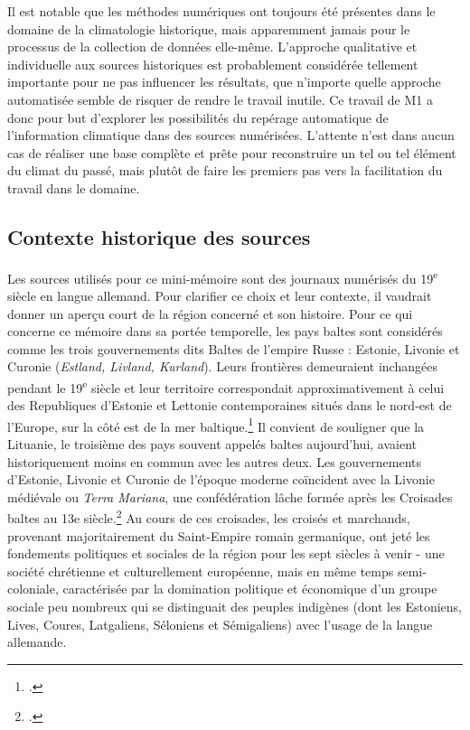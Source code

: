 \documentclass[a4paper,twoside,12pt]{article}
\begin{document}
Il est notable que les méthodes numériques ont toujours été présentes dans le domaine de la climatologie historique, mais apparemment jamais pour le processus de la collection de données elle-même. L'approche qualitative et individuelle aux sources historiques est probablement considérée tellement importante pour ne pas influencer les résultats, que n'importe quelle approche automatisée semble de risquer de rendre le travail inutile. Ce travail de M1 a donc pour but d'explorer les possibilités du repérage automatique de l'information climatique dans des sources numérisées. L'attente n'est dans aucun cas de réaliser une base complète et prête pour reconstruire un tel ou tel élément du climat du passé, mais plutôt de faire les premiers pas vers la facilitation du travail dans le domaine.



\subsection*{Contexte historique des sources}


Les sources utilisés pour ce mini-mémoire sont des journaux numérisés du 19\textsuperscript{e} siècle en langue allemand. Pour clarifier ce choix et leur contexte, il vaudrait donner un aperçu court de la région concerné et son histoire. Pour ce qui concerne ce mémoire dans sa portée temporelle, les pays baltes sont considérés comme les trois gouvernements dits Baltes de l'empire Russe : Estonie, Livonie et Curonie (\textit{Estland, Livland, Kurland}). Leurs frontières demeuraient inchangées pendant le 19\textsuperscript{e} siècle et leur territoire correspondait approximativement à celui des Republiques d'Estonie et Lettonie contemporaines situés dans le nord-est de l'Europe, sur la côté est de la mer baltique.\footcites[Pour un aperçu général de l'histoire de cette région, cf.][]{champonnois_estoniens_2004}{kasekamp_history_2018} Il convient de souligner que la Lituanie, le troisième des pays souvent appelés \og baltes \fg{} aujourd'hui, avaient historiquement moins en commun avec les autres deux. Les gouvernements d'Estonie, Livonie et Curonie de l'époque moderne coïncident avec la Livonie médiévale ou \textit{Terra Mariana}, une confédération lâche formée après les Croisades baltes au 13e siècle.\footcites[Une présentation critique de ces événements se trouve dans][]{murray_clash_2009}{selart_livland_2017} Au cours de ces croisades, les croisés et marchands, provenant majoritairement du Saint-Empire romain germanique, ont jeté les fondements politiques et sociales de la région pour les sept siècles à venir - une société chrétienne et culturellement européenne, mais en même temps semi-coloniale, caractérisée par la domination politique et économique d'un groupe sociale peu nombreux qui se distinguait des peuples indigènes (dont les Estoniens, Lives, Coures, Latgaliens, Séloniens et Sémigaliens) avec l'usage de la langue allemande.
\end{document}
